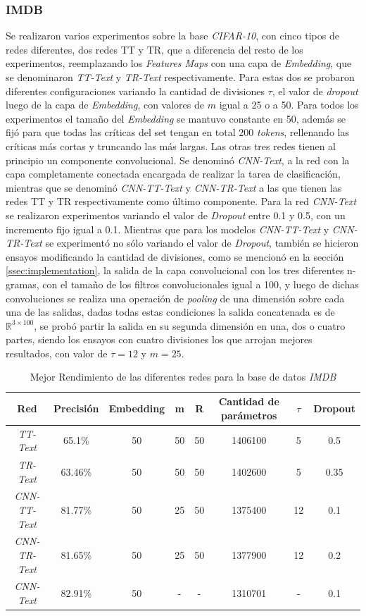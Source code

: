 \documentclass[spanish]{article}
\theoremstyle{definition}
\theoremstyle{remark}
\numberwithin{equation}{section}
\numberwithin{equation}{section} %
\begin{document}
\subsubsection{IMDB}
Se realizaron varios experimentos sobre la base \textit{CIFAR-10}, con cinco tipos de redes diferentes, dos redes TT y TR, que a diferencia del resto de los experimentos, reemplazando los \textit{Features Maps} con una capa de \textit{Embedding}, que se denominaron \textit{TT-Text} y \textit{TR-Text} respectivamente. Para estas dos se probaron diferentes configuraciones variando la cantidad de divisiones $\tau$, el valor de \textit{dropout} luego de la capa de \textit{Embedding}, con valores de $m$ igual a 25 o a 50. Para todos los experimentos el tamaño del \textit{Embedding} se mantuvo constante en 50, además se fijó para que todas las críticas del set tengan en total 200 \textit{tokens}, rellenando las críticas más cortas y truncando las más largas. Las otras tres redes tienen al principio un componente convolucional. Se denominó \textit{CNN-Text}, a la red con la capa completamente conectada encargada de realizar la tarea de clasificación, mientras que se denominó \textit{CNN-TT-Text} y \textit{CNN-TR-Text} a las que tienen las redes TT y TR respectivamente como último componente. Para la red \textit{CNN-Text} se realizaron experimentos variando el valor de \textit{Dropout} entre 0.1 y 0.5, con un incremento fijo igual a 0.1. Mientras que para los modelos \textit{CNN-TT-Text} y \textit{CNN-TR-Text} se experimentó no sólo variando el valor de \textit{Dropout}, también se hicieron ensayos modificando la cantidad de divisiones, como se mencionó en la sección \ref{ssec:implementation}, la salida de la capa convolucional con los tres diferentes n-gramas, con el tamaño de los filtros convolucionales igual a 100, y luego de dichas convoluciones se realiza una operación de \textit{pooling} de una dimensión sobre cada una de las salidas, dadas todas estas condiciones la salida concatenada es de $\mathbb{R}^{3 \times 100}$, se probó partir la salida en su segunda dimensión en una, dos o cuatro partes, siendo los ensayos con cuatro divisiones los que arrojan mejores resultados, con valor de $\tau=12$ y $m=25$.   
\begin{table}[H]
\centering 
\begin{tabular}{ |c|c|c|c|c|c|c|c| } 
 \hline
 Red & Precisión & Embedding & m & R & Cantidad de parámetros  & $\tau$ & Dropout\\
  \hline
\textit{TT-Text} & 65.1\% & 50  & 50 & 50 & 1406100  & 5  & 0.5 \\ 
\textit{TR-Text} & 63.46\% & 50  & 50 & 50 & 1402600 & 5  & 0.35 \\ 
\textit{CNN-TT-Text} & 81.77\% & 50  & 25 & 50 & 1375400 & 12  & 0.1  \\ 
\textit{CNN-TR-Text} & 81.65\% & 50  & 25 & 50 & 1377900 & 12  & 0.2 \\ 
 \textit{CNN-Text} & 82.91\% & 50 & - & - & 1310701  & - & 0.1\\ 
 \hline
\end{tabular}
\caption{Mejor Rendimiento de las diferentes redes para la base de datos \textit{IMDB}}
\label{table:comparacion_IMDB}
\end{table}
\end{document}
